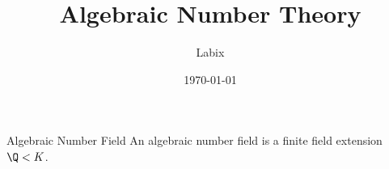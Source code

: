 \documentclass[a4paper]{article}
\title{Algebraic Number Theory}
\author{Labix}
\date{\today}
\begin{document}
\maketitle
\begin{abstract}
\end{abstract}
\tableofcontents
\pagebreak

\section{}
\begin{defn}{Algebraic Number Field}{} An algebraic number field is a finite field extension $\Q<K$. 
\end{defn}
\end{document}
